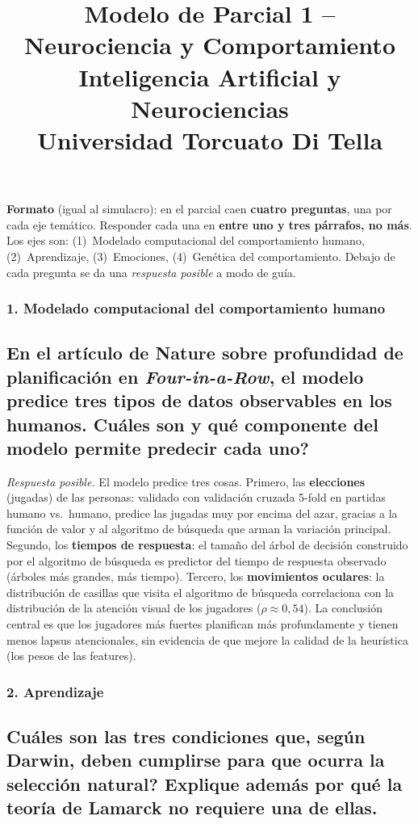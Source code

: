 \documentclass[11pt, a4paper]{article}
\title{\textbf{Modelo de Parcial 1 -- Neurociencia y Comportamiento} \\
\large Inteligencia Artificial y Neurociencias \\ Universidad Torcuato Di Tella}
\author{}
\date{}
\newcommand{\pregunta}[1]{\subsection{#1}}
\newcommand{\eje}[1]{\subsubsection{#1}}
\begin{document}
\maketitle

\begin{mdframed}[linecolor=black, linewidth=0.7pt]
\textbf{Formato} (igual al simulacro): en el parcial caen \textbf{cuatro preguntas}, una por cada eje tem\'atico. Responder cada una en \textbf{entre uno y tres p\'arrafos, no m\'as}. Los ejes son: (1)~Modelado computacional del comportamiento humano, (2)~Aprendizaje, (3)~Emociones, (4)~Gen\'etica del comportamiento. Debajo de cada pregunta se da una \emph{respuesta posible} a modo de gu\'ia.
\end{mdframed}

\eje{1. Modelado computacional del comportamiento humano}
\pregunta{En el art\'iculo de Nature sobre profundidad de planificaci\'on en \textit{Four-in-a-Row}, el modelo predice tres tipos de datos observables en los humanos. \textquestiondown Cu\'ales son y qu\'e componente del modelo permite predecir cada uno?}

\begin{respuesta}
\textit{Respuesta posible.} El modelo predice tres cosas. Primero, las \textbf{elecciones} (jugadas) de las personas: validado con validaci\'on cruzada 5-fold en partidas humano vs.\ humano, predice las jugadas muy por encima del azar, gracias a la funci\'on de valor y al algoritmo de b\'usqueda que arman la variaci\'on principal. Segundo, los \textbf{tiempos de respuesta}: el tama\~no del \'arbol de decisi\'on construido por el algoritmo de b\'usqueda es predictor del tiempo de respuesta observado (\'arboles m\'as grandes, m\'as tiempo). Tercero, los \textbf{movimientos oculares}: la distribuci\'on de casillas que visita el algoritmo de b\'usqueda correlaciona con la distribuci\'on de la atenci\'on visual de los jugadores ($\rho \approx 0{,}54$). La conclusi\'on central es que los jugadores m\'as fuertes planifican m\'as profundamente y tienen menos lapsus atencionales, sin evidencia de que mejore la calidad de la heur\'istica (los pesos de las features).
\end{respuesta}

\eje{2. Aprendizaje}
\pregunta{\textquestiondown Cu\'ales son las tres condiciones que, seg\'un Darwin, deben cumplirse para que ocurra la selecci\'on natural? Explique adem\'as por qu\'e la teor\'ia de Lamarck no requiere una de ellas.}
\end{document}
